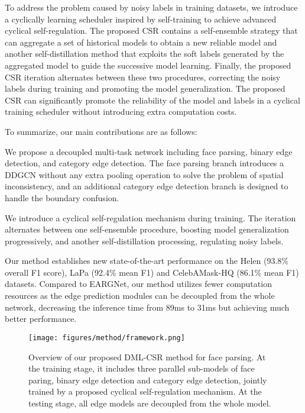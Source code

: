 \documentclass[10pt,twocolumn,letterpaper]{article}
\newenvironment{tight_itemize}{
\begin{itemize}[leftmargin=20pt]
  \setlength{\topsep}{0pt}
  \setlength{\itemsep}{0pt}
  \setlength{\parskip}{0pt}
  \setlength{\parsep}{0pt}
}{\end{itemize}}
\begin{document}
To address the problem caused by noisy labels in training datasets, we introduce a cyclically learning scheduler inspired by self-training \cite{Yarowsky1995UnsupervisedWS, self_train_theory, Yarowsky1995UnsupervisedWS, Zoph2020RethinkingPA, Yalniz2019BillionscaleSL, Chen2020LeveragingSL,li2020self} to achieve advanced cyclical self-regulation. 
The proposed CSR contains a self-ensemble strategy that can aggregate a set of historical models to obtain a new reliable model and another self-distillation method that exploits the soft labels generated by the aggregated model to guide the successive model learning. Finally, the proposed CSR iteration alternates between these two procedures, correcting the noisy labels during training and promoting the model generalization. The proposed CSR can significantly promote the reliability of the model and labels in a cyclical training scheduler without introducing extra computation costs.

To summarize, our main contributions are as follows:
\vspace{-0.2cm}
\begin{tight_itemize}
\item We propose a decoupled multi-task network including face parsing, binary edge detection, and category edge detection. The face parsing branch introduces a DDGCN without any extra pooling operation to solve the problem of spatial inconsistency, and an additional category edge detection branch is designed to handle the boundary confusion.
\item We introduce a cyclical self-regulation mechanism during training. The iteration alternates between one self-ensemble procedure, boosting model generalization progressively, and another self-distillation processing, regulating noisy labels.
\item Our method establishes new state-of-the-art performance on the Helen\cite{helen} (93.8\% overall F1 score), LaPa\cite{lapa} (92.4\% mean F1) and CelebAMask-HQ\cite{CelebAMask-HQ} (86.1\% mean F1) datasets. Compared to EARGNet\cite{te2020edge}, our method utilizes fewer computation resources as the edge prediction modules can be decoupled from the whole network, decreasing the inference time from 89ms to 31ms but achieving much better performance.
\end{tight_itemize}

\begin{figure*}
\centering
\texttt{[image: figures/method/framework.png]}
\vspace{-2.5mm}
\caption{Overview of our proposed DML-CSR method for face parsing. At the training stage, it includes three parallel sub-models of face paring, binary edge detection and category edge detection, jointly trained by a proposed cyclical self-regulation mechanism. At the testing stage, all edge models are decoupled from the whole model.}
\vspace{-6mm}
\label{fig:framwork}
\end{figure*}
\end{document}
